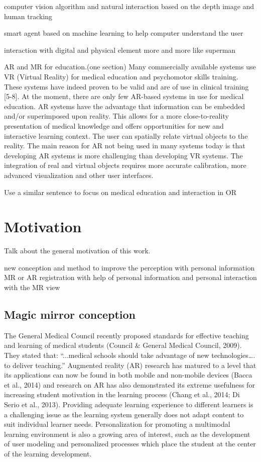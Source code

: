 computer vision algorithm and natural interaction based on the depth image and human tracking

smart agent based on machine learning to help computer understand the user

interaction with digital and physical element more and more like superman 

AR and MR for education.(one section)
Many commercially available systems use VR (Virtual Reality) for medical education and psychomotor skills training. These systems have indeed proven to be valid and are of use in clinical training [5-8]. At the moment, there are only few AR-based systems in use for medical education. AR systems have the advantage that information can be embedded and/or superimposed upon reality. This allows for a more close-to-reality presentation of medical knowledge and offers opportunities for new and interactive learning context. The user can spatially relate virtual objects to the reality. The main reason for AR not being used in many systems today is that developing AR systems is more challenging than developing VR systems. The integration of real and virtual objects requires more accurate calibration, more advanced visualization and other user interfaces.

Use a similar sentence to focus on medical education and interaction in OR

\section{Motivation}
Talk about the general motivation of this work.


new conception and method to improve the perception with personal information 
MR or AR registration with help of personal information and personal interaction with the MR view
\subsection{Magic mirror conception}
The General Medical Council recently proposed standards for effective teaching and learning of medical students (Council \& General Medical Council, 2009). They stated that: “...medical schools should take advantage of new technologies…. to deliver teaching.” Augmented reality (AR) research has matured to a level that its applications can now be found in both mobile and non-mobile devices (Bacca et al., 2014) and research on AR has also demonstrated its extreme usefulness for increasing student motivation in the learning process (Chang et al., 2014; Di Serio et al., 2013). Providing adequate learning experience to different learners is a challenging issue as the learning system generally does not adapt content to suit individual learner needs. Personalization for promoting a multimodal learning environment is also a growing area of interest, such as the development of user modeling and personalized processes which place the student at the center of the learning development.


